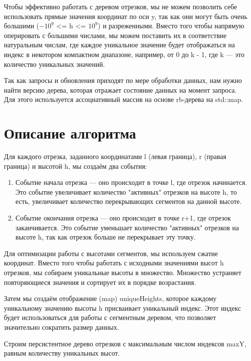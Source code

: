 \documentclass[12pt]{article}
\begin{document}
Чтобы эффективно работать с деревом отрезков, мы не можем позволить себе использовать прямые значения координат по оси y, так как они могут быть очень большими ($-10^{9}$ <= h <= $10^{9}$) и разреженными.
Вместо того чтобы напрямую оперировать с большими числами, мы можем поставить их в соответствие натуральным числам, где каждое уникальное значение будет отображаться на индекс в некотором компактном диапазоне, например, от 0 до k - 1, где k — это количество уникальных значений.

Так как запросы и обновления приходят по мере обработки данных, нам нужно найти версию дерева, которая отражает состояние данных на момент запроса. Для этого используется ассоциативный массив на основе rb-дерева на std::map.

\newpage
\section*{Описание алгоритма}

Для каждого отрезка, заданного координатами l (левая граница), r (правая граница) и высотой h, мы создаём два события:

\begin{enumerate}
    \item Событие начала отрезка — оно происходит в точке l, где отрезок начинается. Это событие увеличивает количество "активных" отрезков на высоте h, то есть, увеличивает количество перекрывающих сегментов на данной высоте.
    \item Событие окончания отрезка — оно происходит в точке r+1, где отрезок заканчивается. Это событие уменьшает  количество "активных" отрезков на высоте h, так как отрезок больше не перекрывает эту точку.
\end{enumerate}

Для оптимизации работы с высотами сегментов, мы используем сжатие координат. Вместо того чтобы работать с исходными значениями высот h отрезков, мы собираем уникальные высоты в множество. Множество устраняет повторяющиеся значения и сортирует их в порядке возрастания.

Затем мы создаём отображение (map) uniqueHeights, которое каждому уникальному значению высоты h присваивает уникальный индекс. Этот индекс будет использоваться для работы с сегментным деревом, что позволяет значительно сократить размер данных. 

Строим персистентное дерево отрезков с максимальным числом индексов maxY, равным количеству уникальных высот.
\end{document}
